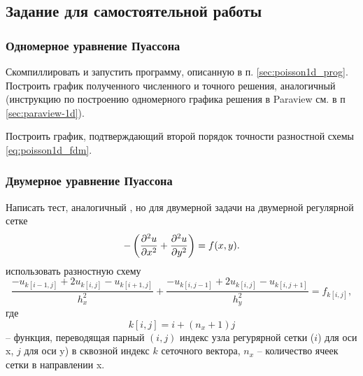 \clearpage
\subsection{Задание для самостоятельной работы}

\subsubsection{Одномерное уравнение Пуассона}

Скомпиллировать и запустить программу, описанную в п. \ref{sec:poisson1d_prog}.
Построить график полученного численного и точного решения, аналогичный 
(инструкцию по построению одномерного графика решения в Paraview см. в п \ref{sec:paraview-1d}).

Построить график, подтверждающий второй порядок точности
разностной схемы \eqref{eq:poisson1d_fdm}.

\subsubsection{Двумерное уравнение Пуассона}
\label{sec:hw_poisson_2d}

Написать тест, аналогичный \cvar{[poisson1]}, но
для двумерной задачи на двумерной регулярной сетке
\begin{equation*}
   -\left(\frac{\partial^2 u}{\partial x^2} + \frac{\partial^2 u}{\partial y^2}\right) = f(x, y).
\end{equation*}
использовать разностную схему
\begin{equation*}
   \frac{-u_{k[i-1,j]} + 2 u_{k[i, j]} - u_{k[i+1,j]}}{h_x^2} +
   \frac{-u_{k[i,j-1]} + 2 u_{k[i, j]} - u_{k[i,j+1]}}{h_y^2} =
   f_{k[i,j]},
\end{equation*}
где
\begin{equation}
    \label{eq:tasks_ij2k}
    k[i, j] = i + (n_x+1) j
\end{equation}
-- функция, переводящая парный $(i,j)$ индекс узла регурярной сетки ($i$) для оси x, $j$ для оси y) в сквозной индекс $k$
сеточного вектора, $n_x$ -- количество ячеек сетки в направлении x.

